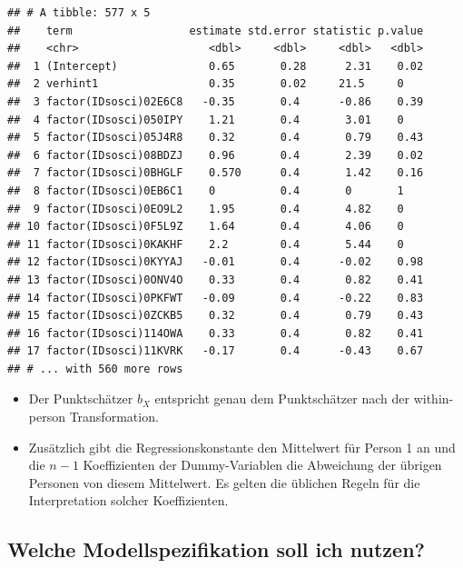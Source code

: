 \documentclass[]{book}
\providecommand{\tightlist}{%
  \setlength{\itemsep}{0pt}\setlength{\parskip}{0pt}}
\begin{document}
\begin{verbatim}
## # A tibble: 577 x 5
##    term                  estimate std.error statistic p.value
##    <chr>                    <dbl>     <dbl>     <dbl>   <dbl>
##  1 (Intercept)              0.65       0.28      2.31    0.02
##  2 verhint1                 0.35       0.02     21.5     0   
##  3 factor(IDsosci)02E6C8   -0.35       0.4      -0.86    0.39
##  4 factor(IDsosci)050IPY    1.21       0.4       3.01    0   
##  5 factor(IDsosci)05J4R8    0.32       0.4       0.79    0.43
##  6 factor(IDsosci)08BDZJ    0.96       0.4       2.39    0.02
##  7 factor(IDsosci)0BHGLF    0.570      0.4       1.42    0.16
##  8 factor(IDsosci)0EB6C1    0          0.4       0       1   
##  9 factor(IDsosci)0EO9L2    1.95       0.4       4.82    0   
## 10 factor(IDsosci)0F5L9Z    1.64       0.4       4.06    0   
## 11 factor(IDsosci)0KAKHF    2.2        0.4       5.44    0   
## 12 factor(IDsosci)0KYYAJ   -0.01       0.4      -0.02    0.98
## 13 factor(IDsosci)0ONV4O    0.33       0.4       0.82    0.41
## 14 factor(IDsosci)0PKFWT   -0.09       0.4      -0.22    0.83
## 15 factor(IDsosci)0ZCKB5    0.32       0.4       0.79    0.43
## 16 factor(IDsosci)114OWA    0.33       0.4       0.82    0.41
## 17 factor(IDsosci)11KVRK   -0.17       0.4      -0.43    0.67
## # ... with 560 more rows
\end{verbatim}

\begin{itemize}
\tightlist
\item
  Der Punktschätzer \(b_{X}\) entspricht genau dem Punktschätzer nach der within-person Transformation.
\item
  Zusätzlich gibt die Regressionskonstante den Mittelwert für Person 1 an und die \(n - 1\) Koeffizienten der Dummy-Variablen die Abweichung der übrigen Personen von diesem Mittelwert. Es gelten die üblichen Regeln für die Interpretation solcher Koeffizienten.
\end{itemize}

\hypertarget{welche-modellspezifikation-soll-ich-nutzen}{%
\subsection*{Welche Modellspezifikation soll ich nutzen?}\label{welche-modellspezifikation-soll-ich-nutzen}}
\end{document}
